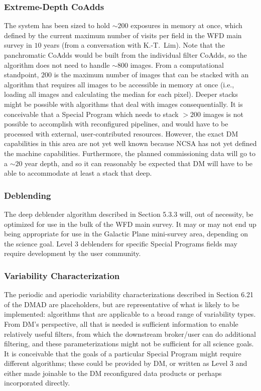 \subsubsection{Extreme-Depth CoAdds} The system has been sized to hold $\sim200$ exposures in memory at once, which defined by the current maximum number of visits per field in the WFD main survey in $10$ years (from a conversation with K.-T.~Lim). Note that the panchromatic CoAdds would be built from the individual filter CoAdds, so the algorithm does not need to handle $\sim800$ images. From a computational standpoint, $200$ is the maximum number of images that can be stacked with an algorithm that requires all images to be accessible in memory at once (i.e., loading all images and calculating the median for each pixel). Deeper stacks might be possible with algorithms that deal with images consequentially. It is conceivable that a Special Program which needs to stack $>200$ images is not possible to accomplish with reconfigured pipelines, and would have to be processed with external, user-contributed resources. However, the exact DM capabilities in this area are not yet well known because NCSA has not yet defined the machine capabilities. Furthermore, the planned commissioning data will go to a $\sim20$ year depth, and so it can reasonably be expected that DM will have to be able to accommodate at least a stack that deep.

\subsubsection{Deblending} The deep deblender algorithm described in Section 5.3.3 will, out of necessity, be optimized for use in the bulk of the WFD main survey. It may or may not end up being appropriate for use in the Galactic Plane mini-survey area, depending on the science goal. Level 3 deblenders for specific Special Programs fields may require development by the user community.

\subsubsection{Variability Characterization} The periodic and aperiodic variability characterizations described in Section 6.21 of the DMAD are placeholders, but are representative of what is likely to be implemented: algorithms that are applicable to a broad range of variability types. From DM's perspective, all that is needed is sufficient information to enable relatively useful filters, from which the downstream broker/user can do additional filtering, and these parameterizations might not be sufficient for all science goals. It is conceivable that the goals of a particular Special Program might require different algorithms; these could be provided by DM, or written as Level 3 and either made joinable to the DM reconfigured data products or perhaps incorporated directly.

